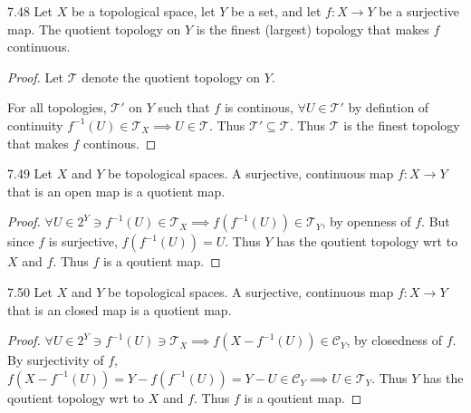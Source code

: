 \documentclass{article}
\newcommand*{\T}{\mathcal{T}}
\newcommand*{\subeq}{\subseteq}
\begin{document}
\bigskip

\begin{claim}{7.48}\label{Claim 7.48.}
    Let $X$ be a topological space, let $Y$ be a set, and let $f: X \to Y$ be a surjective map. The quotient topology on $Y$ is the finest (largest) topology that makes $f$ continuous.
\end{claim}
\begin{proof}
    Let $\T$ denote the quotient topology on $Y$.
    
    For all topologies, $\T'$ on $Y$ such that $f$ is continous, $\forall U \in \T'$ by defintion of continuity $f^{-1}(U) \in \T_X \implies U \in \T$. Thus $\T' \subeq \T$. Thus $\T$ is the finest topology that makes $f$ continous.            
\end{proof}

\bigskip

\begin{claim}{7.49}\label{Claim 7.49.}
    Let $X$ and $Y$ be topological spaces. A surjective, continuous map $f: X \to Y$ that is an open map is a quotient map.
\end{claim}
\begin{proof}
    $\forall U \in 2^Y \ni f^{-1}(U) \in \T_X \implies f(f^{-1}(U)) \in \T_Y$, by openness of $f$. But since $f$ is surjective, $f(f^{-1}(U)) = U$. Thus $Y$ has the qoutient topology wrt to $X$ and $f$. Thus $f$ is a qoutient map.            
\end{proof}

\bigskip

\begin{claim}{7.50}\label{Claim 7.50.}
    Let $X$ and $Y$ be topological spaces. A surjective, continuous map $f: X \to Y$ that is an closed map is a quotient map.
\end{claim}
\begin{proof}
    $\forall U \in 2^Y \ni f^{-1}(U) \ni \T_X \implies f(X - f^{-1}(U)) \in \mathcal{C}_Y$, by closedness of $f$. By surjectivity of $f$, $f(X - f^{-1}(U)) = Y - f(f^{-1}(U)) = Y - U \in \mathcal{C}_Y \implies U \in \T_Y$. Thus $Y$ has the qoutient topology wrt to $X$ and $f$. Thus $f$ is a qoutient map.                  
\end{proof}

\bigskip
\end{document}
